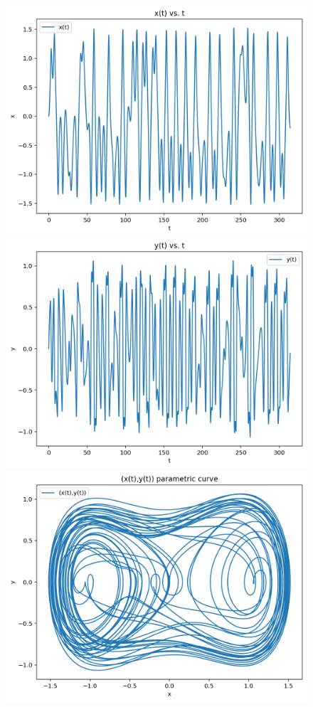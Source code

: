 \documentclass{article}
\begin{document}
\begin{figure}[h!]
\includegraphics[scale=0.4]{x(t)5.png}
\includegraphics[scale=0.4]{y(t)5.png}
\includegraphics[scale=0.4]{parametriccurve5.png}

\end{figure}
\end{document}
